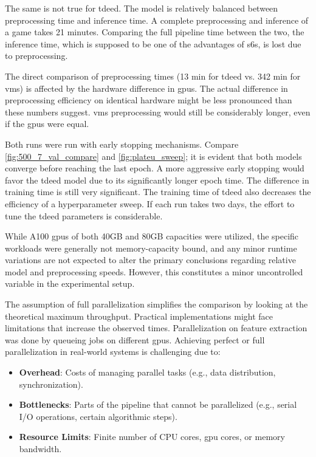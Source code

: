The same is not true for \acrshort{tdeed}. The model is relatively balanced between preprocessing time and inference time. A complete preprocessing and inference of a game takes 21 minutes. Comparing the full pipeline time between the two, the inference time, which is supposed to be one of the advantages of \acrlong{s6}s, is lost due to preprocessing. 

The direct comparison of preprocessing times (13 min for \acrshort{tdeed} vs. 342 min for \acrshort{vms}) is affected by the hardware difference in \acrshort{gpu}s. The actual difference in preprocessing efficiency on identical hardware might be less pronounced than these numbers suggest. \acrshort{vms} preprocessing would still be considerably longer, even if the \acrshort{gpu}s were equal. 


Both runs were run with early stopping mechanisms. Compare \cref{fig:500_7_val_compare} and \cref{fig:plateu_sweep}; it is evident that both models converge before reaching the last epoch. A more aggressive early stopping would favor the \acrshort{tdeed} model due to its significantly longer epoch time. The difference in training time is still very significant. The training time of \acrshort{tdeed} also decreases the efficiency of a hyperparameter sweep. If each run takes two days, the effort to tune the \acrshort{tdeed} parameters is considerable. 

While A100 \acrshort{gpu}s of both 40GB and 80GB capacities were utilized, the specific workloads were generally not memory-capacity bound, and any minor runtime variations are not expected to alter the primary conclusions regarding relative model and preprocessing speeds. However, this constitutes a minor uncontrolled variable in the experimental setup. 

The assumption of full parallelization simplifies the comparison by looking at the theoretical maximum throughput. Practical implementations might face limitations that increase the observed times. Parallelization on feature extraction was done by queueing jobs on different \acrshort{gpu}s. Achieving perfect or full parallelization in real-world systems is challenging due to:
\begin{itemize}
    \item \textbf{Overhead}: Costs of managing parallel tasks (e.g., data distribution, synchronization).
    \item \textbf{Bottlenecks}: Parts of the pipeline that cannot be parallelized (e.g., serial I/O operations, certain algorithmic steps).
    \item \textbf{Resource Limits}: Finite number of CPU cores, \acrshort{gpu} cores, or memory bandwidth.
\end{itemize}

